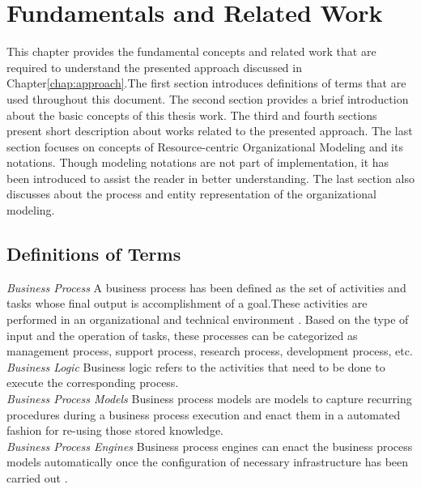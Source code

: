 \chapter{Fundamentals and Related Work}
\label{chap:fundamentals}
This chapter provides the fundamental concepts and related work that are required to understand the presented approach discussed in Chapter\ref{chap:approach}.The first section introduces definitions of terms that are used throughout this document. The second section provides a brief introduction about the basic concepts of this thesis work.  The third and fourth sections present short description about  works related to the presented approach. The last section focuses on concepts of Resource-centric Organizational Modeling and its notations. Though modeling notations are not part of implementation, it has been introduced to assist the reader in better understanding. The last section also discusses about the process and entity representation of the organizational modeling.  



\section{Definitions of Terms}
\label{sec:termdefinitions}
\textit{Business Process} A business process has been defined as the set of activities and tasks whose final output is accomplishment of a goal.These activities are performed in an organizational and technical environment \cite{Weske2012}.  Based on the type of input and the operation of tasks, these processes can be categorized as management process, support process, research process, development process, etc. \cite{Sungur2015}     \\

\textit{Business Logic} Business logic refers to the activities that need to be done to execute the corresponding process. \\

\textit{Business Process Models} Business process models are models to capture recurring procedures during a business process execution and enact them in a automated fashion for re-using those stored knowledge. \\

\textit{Business Process Engines} Business process engines can enact the business process models automatically once the configuration of necessary infrastructure has been carried out \cite{Sungur2015}. \\

